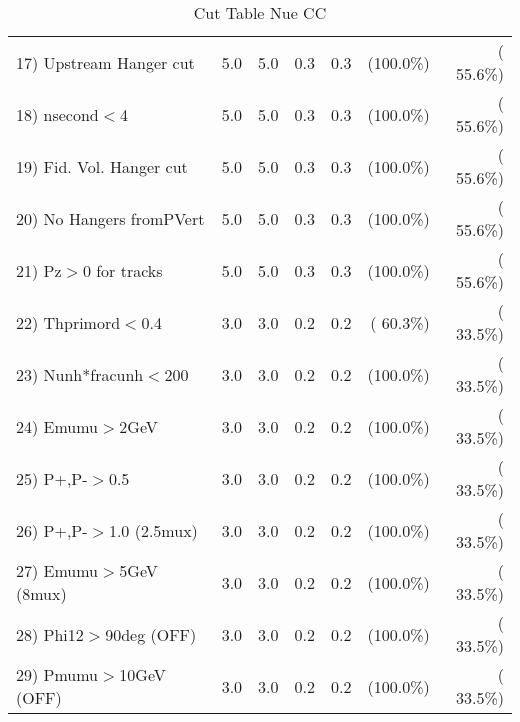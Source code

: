 \begin{table}[h!]
\begin{tabular}{||l||r|r|r|r|r|r||}
 17) Upstream Hanger cut  &          5.0 &          5.0 &          0.3 &          0.3 & (100.0\%) & ( 55.6\%) \\
 18) nsecond$<$4          &          5.0 &          5.0 &          0.3 &          0.3 & (100.0\%) & ( 55.6\%) \\
 19) Fid. Vol. Hanger cut &          5.0 &          5.0 &          0.3 &          0.3 & (100.0\%) & ( 55.6\%) \\
 20) No Hangers fromPVert &          5.0 &          5.0 &          0.3 &          0.3 & (100.0\%) & ( 55.6\%) \\
 21) Pz$>$0 for tracks    &          5.0 &          5.0 &          0.3 &          0.3 & (100.0\%) & ( 55.6\%) \\
 22) Thprimord$<$0.4      &          3.0 &          3.0 &          0.2 &          0.2 & ( 60.3\%) & ( 33.5\%) \\
 23) Nunh*fracunh$<$200   &          3.0 &          3.0 &          0.2 &          0.2 & (100.0\%) & ( 33.5\%) \\
 24) Emumu$>$2GeV         &          3.0 &          3.0 &          0.2 &          0.2 & (100.0\%) & ( 33.5\%) \\
 25) P+,P-$>$0.5          &          3.0 &          3.0 &          0.2 &          0.2 & (100.0\%) & ( 33.5\%) \\
 26) P+,P-$>$1.0 (2.5mux) &          3.0 &          3.0 &          0.2 &          0.2 & (100.0\%) & ( 33.5\%) \\
 27) Emumu$>$5GeV  (8mux) &          3.0 &          3.0 &          0.2 &          0.2 & (100.0\%) & ( 33.5\%) \\
 28) Phi12$>$90deg  (OFF) &          3.0 &          3.0 &          0.2 &          0.2 & (100.0\%) & ( 33.5\%) \\
 29) Pmumu$>$10GeV  (OFF) &          3.0 &          3.0 &          0.2 &          0.2 & (100.0\%) & ( 33.5\%) \\
 \hline
 \hline
 \end{tabular}
 \caption{Cut Table   Nue CC  }
 \label{tab-cutcohjpsi-mumu_nuecc}
 \end{table}
